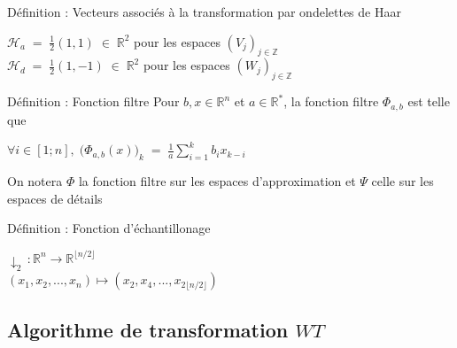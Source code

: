 \documentclass[10pt]{beamer}
\begin{document}
      \begin{frame}
	\begin{beamerboxesrounded}[scheme=def]{D\'{e}finition : Vecteurs associ\'{e}s \`{a} la transformation par ondelettes de Haar}
	  \begin{center}
	    $ \mathcal{H}_a \; = \; \frac{1}{2} (1, 1) \; \in \; \mathbb{R}^2 $ pour les espaces $(V_j)_{j \in \mathbb{Z}}$ \\
	    $ \mathcal{H}_d \; = \; \frac{1}{2} (1, -1) \; \in \; \mathbb{R}^2 $ pour les espaces $(W_j)_{j \in \mathbb{Z}}$
	  \end{center}
	\end{beamerboxesrounded}
	  
	\begin{beamerboxesrounded}[scheme=def]{D\'{e}finition : Fonction filtre}
	    Pour $ b, x \in \mathbb{R}^n $ et $ a \in \mathbb{R}^* $, 
	    la fonction filtre $ \Phi_{a,b} $ est telle que
	    \begin{center}
	      $ \forall i \in [1;n], \; \Big(\Phi_{a,b}(x)\Big)_k \; = \; \frac{1}{a} \displaystyle\sum_{i = 1}^k b_i x_{k - i} $
	    \end{center}
	    On notera $\varPhi$ la fonction filtre sur les espaces d'approximation
	    et $\varPsi$ celle sur les espaces de d\'{e}tails 
	\end{beamerboxesrounded}
	    
	\begin{beamerboxesrounded}[scheme=def]{D\'{e}finition : Fonction d'\'{e}chantillonage}
	    \begin{center}
	      $ \downarrow_2 \, : \mathbb{R}^n \longrightarrow \mathbb{R}^{\lfloor n / 2 \rfloor} $ \\
	      $ (x_1, x_2, ..., x_n) \longmapsto (x_2, x_{4}, ..., x_{2 \lfloor n / 2 \rfloor}) $
	    \end{center}
	\end{beamerboxesrounded}
	
      \end{frame}
      
    \subsection{Algorithme de transformation $WT$}
      
\end{document}
